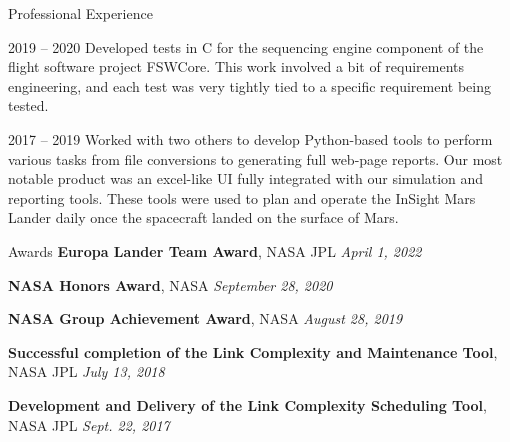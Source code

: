 \documentclass{resume} %
\begin{document}
\begin{rSection}{Professional Experience}{}
{        
        {}
        {2019 -- 2020}
        {
          Developed tests in C for the sequencing engine component of the flight software project FSWCore. This work involved a bit of requirements engineering, and each test was very tightly tied to a specific requirement being tested.
        }

        {}
        {2017 -- 2019}
        {
          Worked with two others to develop Python-based tools to perform various tasks from file conversions to generating full web-page reports. Our most notable product was an excel-like UI fully integrated with our simulation and reporting tools. These tools were used to plan and operate the InSight Mars Lander daily once the spacecraft landed on the surface of Mars.
        }

    }
\end{rSection}

\begin{rSection}{Awards}{}
  \textbf{Europa Lander Team Award}, NASA JPL
  \hfill
  \emph{April 1, 2022}

  \textbf{NASA Honors Award}, NASA
  \hfill
  \emph{September 28, 2020}

  \textbf{NASA Group Achievement Award}, NASA
  \hfill
  \emph{August 28, 2019}

  \textbf{Successful completion of the Link Complexity and Maintenance Tool}, NASA JPL
  \hfill
  \emph{July 13, 2018}

  \textbf{Development and Delivery of the Link Complexity Scheduling Tool}, NASA JPL
  \hfill
  \emph{Sept. 22, 2017}

\end{rSection}
\end{document}
